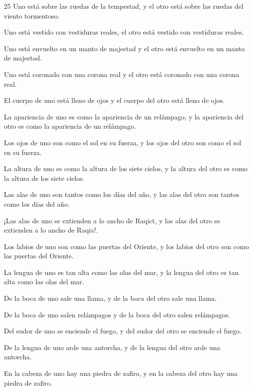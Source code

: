 \par 25 Uno está sobre las ruedas de la tempestad, y el otro está sobre las ruedas del viento tormentoso.

\par Uno está vestido con vestiduras reales, el otro está vestido con vestiduras reales.

\par Uno está envuelto en un manto de majestad y el otro está envuelto en un manto de majestad.

\par Uno está coronado con una corona real y el otro está coronado con una corona real.

\par El cuerpo de uno está lleno de ojos y el cuerpo del otro está lleno de ojos.

La apariencia de uno es como la apariencia de un relámpago, y la apariencia del otro es como la apariencia de un relámpago.

Los ojos de uno son como el sol en su fuerza, y los ojos del otro son como el sol en su fuerza.

\par La altura de uno es como la altura de los siete cielos, y la altura del otro es como la altura de los siete cielos.

\par Las alas de uno son tantos como los días del año, y las alas del otro son tantos como los días del año.

\par ¡Las alas de uno se extienden a lo ancho de Raqict, y las alas del otro se extienden a lo ancho de Raqia!.

Los labios de uno son como las puertas del Oriente, y los labios del otro son como las puertas del Oriente.

La lengua de uno es tan alta como las olas del mar, y la lengua del otro es tan alta como las olas del mar.

De la boca de uno sale una llama, y ​​de la boca del otro sale una llama.

De la boca de uno salen relámpagos y de la boca del otro salen relámpagos.

Del sudor de uno se enciende el fuego, y del sudor del otro se enciende el fuego.

\par De la lengua de uno arde una antorcha, y de la lengua del otro arde una antorcha.

\par En la cabeza de uno hay una piedra de zafiro, y en la cabeza del otro hay una piedra de zafiro.

